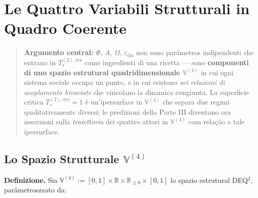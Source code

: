 \chapter{Le Quattro Variabili Strutturali in Quadro
Coerente}\label{le-quattro-variáveis-strutturali-in-quadro-coerente}

\begin{quote}
\textbf{Argumento central:} \(\Phi\), \(A\), \(\Omega\),
\(\varepsilon_{\text{dis}}\) non sono parâmetros indipendenti che entrano
in \(T_s^{(2),\text{sys}}\) come ingredienti di una ricetta --- sono
\textbf{componenti di uno spazio estrutural quadridimensionale
\(\mathbb{V}^{(4)}\)} in cui ogni sistema sociale occupa un punto, e in
cui esistono \emph{sei relazioni di acoplamento bivariate} che
vincolano la dinamica congiunta. La superficie critica
\(T_s^{(2),\text{sys}} = 1\) è un'ipersurface in \(\mathbb{V}^{(4)}\)
che separa due regimi qualitativamente diversi; le predizioni della
Parte III diventano ora asserzioni sulla \emph{traiettoria} dei quattro
attori in \(\mathbb{V}^{(4)}\) com relação a tale ipersurface.
\end{quote}



\section{\texorpdfstring{Lo Spazio Strutturale
\(\mathbb{V}^{(4)}\)}{Lo Spazio Strutturale \textbackslash mathbb\{V\}\^{}\{(4)\}}}\label{lo-spazio-estrutural-mathbbv4}

\Hypoth{} \textbf{Definizione.} Sia
\(\mathbb{V}^{(4)} := [0, 1] \times \mathbb{R} \times \mathbb{R}_{\geq 0} \times [0, 1]\)
lo spazio estrutural DEQ$^2$, parâmetroszzato da:

